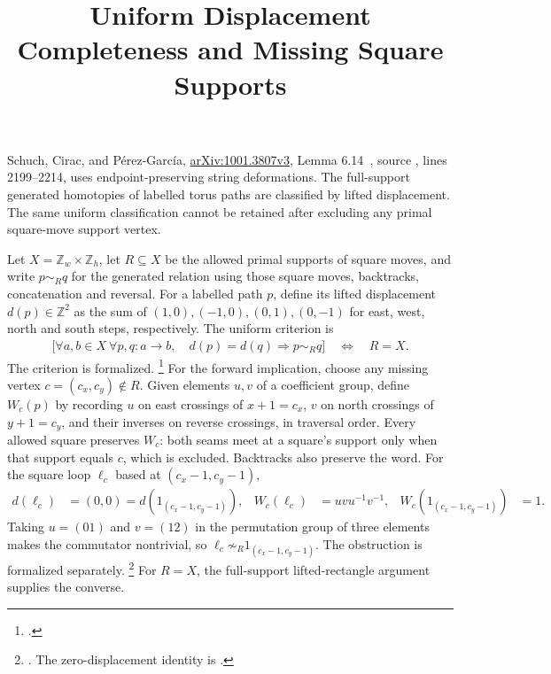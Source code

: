 \documentclass{article}
\title{Uniform Displacement Completeness and Missing Square Supports}
\author{}
\date{}
\begin{document}
\maketitle
{}

Schuch, Cirac, and P\'erez-Garc\'ia,
\href{https://arxiv.org/abs/1001.3807v3}{arXiv:1001.3807v3},
Lemma 6.14~\cite[Lemma~6.14]{Schuch2010PEPS}, source , lines 2199--2214,
uses endpoint-preserving string deformations. The full-support generated
homotopies of labelled torus paths are classified by lifted displacement.
The same uniform classification cannot be retained after excluding any
primal square-move support vertex.

Let $X=\mathbb Z_w\times\mathbb Z_h$, let $R\subseteq X$ be the allowed
primal supports of square moves, and write $p\sim_Rq$ for the generated
relation using those square moves, backtracks, concatenation and reversal.
For a labelled path $p$, define its lifted displacement $d(p)\in\mathbb Z^2$
as the sum of $(1,0),(-1,0),(0,1),(0,-1)$ for east, west, north and south
steps, respectively. The uniform criterion is
\begin{align}
    \bigl[\forall a,b\in X\ \forall p,q:a\to b,\quad
        d(p)=d(q)\Longrightarrow p\sim_Rq\bigr]
    \quad\Longleftrightarrow\quad R=X.
    \label{eq:scp10_restricted_displacement_uniform}
\end{align}
The criterion is formalized.
\footnote{.}
For the forward implication, choose any missing vertex $c=(c_x,c_y)\notin R$.
Given elements $u,v$ of a coefficient group, define $W_c(p)$ by recording
$u$ on east crossings of $x+1=c_x$, $v$ on north crossings of $y+1=c_y$,
and their inverses on reverse crossings, in traversal order.
Every allowed square preserves $W_c$: both seams meet at a square's support
only when that support equals $c$, which is excluded. Backtracks also
preserve the word. For the square loop $\ell_c$ based at $(c_x-1,c_y-1)$,
\begin{align}
    d(\ell_c)&=(0,0)=d(1_{(c_x-1,c_y-1)}),&
    W_c(\ell_c)&=uvu^{-1}v^{-1},&
    W_c(1_{(c_x-1,c_y-1)})&=1.
    \label{eq:scp10_restricted_displacement_commutator}
\end{align}
Taking $u=(01)$ and $v=(12)$ in the permutation group of three elements
makes the commutator nontrivial, so $\ell_c\not\sim_R1_{(c_x-1,c_y-1)}$.
The obstruction is formalized separately.
\footnote{.
The zero-displacement identity is
.}
For $R=X$, the full-support lifted-rectangle argument supplies the converse.
\end{document}
